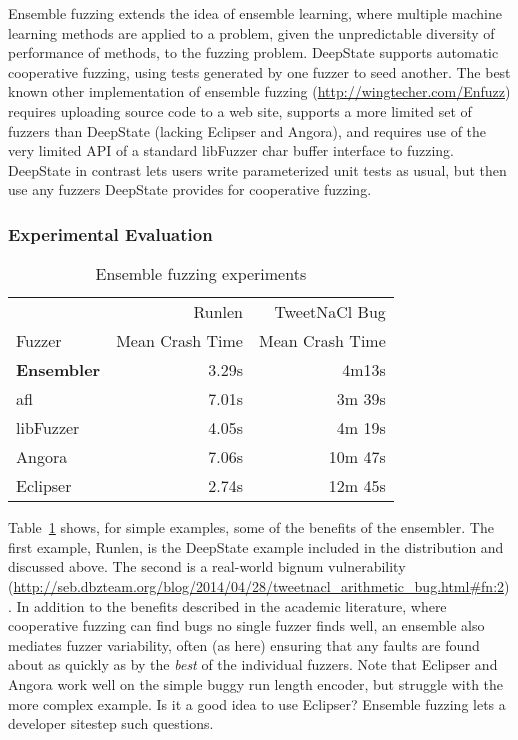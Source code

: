 \documentclass[sigconf]{acmart}
\begin{document}
Ensemble fuzzing \cite{chen2019enfuzz} extends the idea of ensemble learning, where multiple machine learning methods are applied to a problem, given the unpredictable diversity of performance of methods, to the fuzzing problem.  DeepState supports automatic cooperative fuzzing, using tests generated by one fuzzer to seed another.  The best known other implementation of ensemble fuzzing (\url{http://wingtecher.com/Enfuzz}) requires uploading source code to a web site, supports a more limited set of fuzzers than DeepState (lacking Eclipser and Angora), and requires use of the very limited API of a standard libFuzzer char buffer interface to fuzzing.  DeepState in contrast lets users write parameterized unit tests as usual, but then use any fuzzers DeepState provides for cooperative fuzzing.

\subsubsection{Experimental Evaluation}

\begin{table}
\centering
\begin{tabular}{l|r|r}
 & Runlen & TweetNaCl Bug \\
  Fuzzer & Mean Crash Time & Mean Crash Time \\
  \hline
  {\bf Ensembler} & 3.29s & 4m13s \\
  afl & 7.01s & 3m 39s \\
  libFuzzer & 4.05s & 4m 19s \\
  Angora & 7.06s & 10m 47s \\
  Eclipser & 2.74s & 12m 45s \\
\end{tabular}
\caption{Ensemble fuzzing experiments}
\label{tab:ensemble}
\end{table}

Table~\ref{tab:ensemble} shows, for simple examples, some of the benefits of the ensembler.  The first example, Runlen, is the DeepState example included in the distribution and discussed above.  The second is a real-world bignum vulnerability (\url{http://seb.dbzteam.org/blog/2014/04/28/tweetnacl_arithmetic_bug.html\#fn:2}).  In addition to the benefits described in the academic literature, where cooperative fuzzing can find bugs no single fuzzer finds well, an ensemble also mediates fuzzer variability, often (as here) ensuring that any faults are found about as quickly as by the \emph{best} of the individual fuzzers.  Note that Eclipser and Angora work well on the simple buggy run length encoder, but struggle with the more complex example.  Is it a good idea to use Eclipser?  Ensemble fuzzing lets a developer sitestep such questions.
\end{document}
